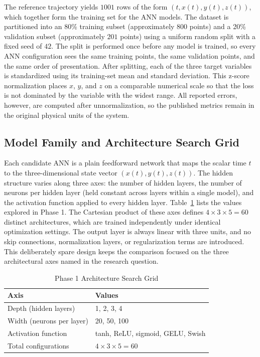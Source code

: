 The reference trajectory yields $1001$ rows of the form $(t, x(t), y(t), z(t))$, which together form the training set for the ANN models. The dataset is partitioned into an 80\% training subset (approximately $800$ points) and a 20\% validation subset (approximately $201$ points) using a uniform random split with a fixed seed of $42$. The split is performed once before any model is trained, so every ANN configuration sees the same training points, the same validation points, and the same order of presentation. After splitting, each of the three target variables is standardized using its training-set mean and standard deviation. This z-score normalization places $x$, $y$, and $z$ on a comparable numerical scale so that the loss is not dominated by the variable with the widest range. All reported errors, however, are computed after unnormalization, so the published metrics remain in the original physical units of the system.

\subsection{Model Family and Architecture Search Grid}

Each candidate ANN is a plain feedforward network that maps the scalar time $t$ to the three-dimensional state vector $(x(t), y(t), z(t))$. The hidden structure varies along three axes: the number of hidden layers, the number of neurons per hidden layer (held constant across layers within a single model), and the activation function applied to every hidden layer. Table~\ref{tab:phase1grid} lists the values explored in Phase 1. The Cartesian product of these axes defines $4 \times 3 \times 5 = 60$ distinct architectures, which are trained independently under identical optimization settings. The output layer is always linear with three units, and no skip connections, normalization layers, or regularization terms are introduced. This deliberately spare design keeps the comparison focused on the three architectural axes named in the research question.

\begin{table}[!ht]
\centering
\caption{Phase 1 Architecture Search Grid}
\label{tab:phase1grid}
\renewcommand{\arraystretch}{1.2}
\begin{tabular}{|l|l|}
\hline
\textbf{Axis} & \textbf{Values} \\
\hline
Depth (hidden layers) & 1, 2, 3, 4 \\
\hline
Width (neurons per layer) & 20, 50, 100 \\
\hline
Activation function & tanh, ReLU, sigmoid, GELU, Swish \\
\hline
Total configurations & $4 \times 3 \times 5 = 60$ \\
\hline
\end{tabular}
\end{table}

